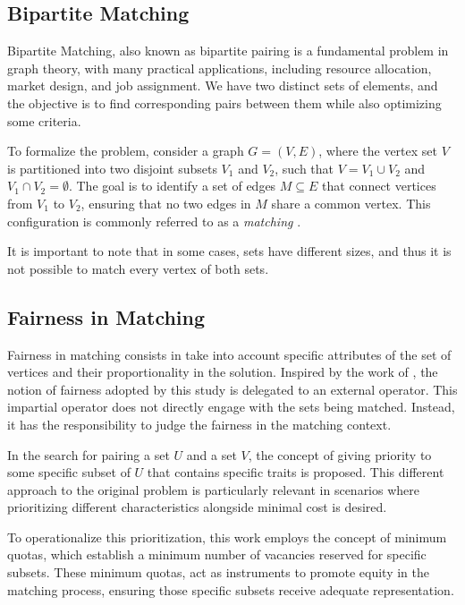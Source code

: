         \subsection{Bipartite Matching}

            Bipartite Matching, also known as bipartite pairing is a fundamental problem in graph theory, with many practical applications, including resource allocation, market design, and job assignment.
            We have two distinct sets of elements, and the objective is to find corresponding pairs between them while also optimizing some criteria.
            
            To formalize the problem, consider a graph \( G = (V, E) \), where the vertex set \( V \) is partitioned into two disjoint subsets \( V_1 \) and \( V_2 \), such that \( V = V_1 \cup V_2 \) and \( V_1 \cap V_2 = \emptyset \). The goal is to identify a set of edges \( M \subseteq E \) that connect vertices from \( V_1 \) to \( V_2 \), ensuring that no two edges in \( M \) share a common vertex. This configuration is commonly referred to as a \textit{matching} \cite{hopcroft1973n}.
            
            It is important to note that in some cases, sets have different sizes, and thus it is not possible to match every vertex of both sets.
            
        \subsection{Fairness in Matching}
            
            Fairness in matching consists in take into account specific attributes of the set of vertices and their proportionality in the solution.
            Inspired by the work of \cite{sankar}, the notion of fairness adopted by this study is delegated to an external operator. This impartial operator does not directly engage with the sets being matched. Instead, it has the responsibility to judge the fairness in the matching context.
            
            In the search for pairing a set $U$ and a set $V$, the concept of giving priority to some specific subset of $U$ that contains specific traits is proposed. This different approach to the original problem is particularly relevant in scenarios where prioritizing different characteristics alongside minimal cost is desired.
            
            To operationalize this prioritization, this work employs the concept of minimum quotas, which establish a minimum number of vacancies reserved for specific subsets. 
            These minimum quotas, act as instruments to promote equity in the matching process, ensuring those specific subsets receive adequate representation.
            
